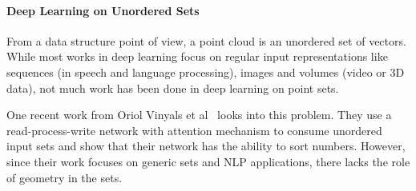 \paragraph{Deep Learning on Unordered Sets}

From a data structure point of view, a point cloud is an unordered set of vectors. While most works in deep learning focus on regular input representations like sequences (in speech and language processing), images and volumes (video or 3D data), not much work has been done in deep learning on point sets.

One recent work from Oriol Vinyals et al~\cite{vinyals2015order} looks into this problem. They use a read-process-write network with attention mechanism to consume unordered input sets and show that their network has the ability to sort numbers. However, since their work focuses on generic sets and NLP applications, there lacks the role of geometry in the sets.


